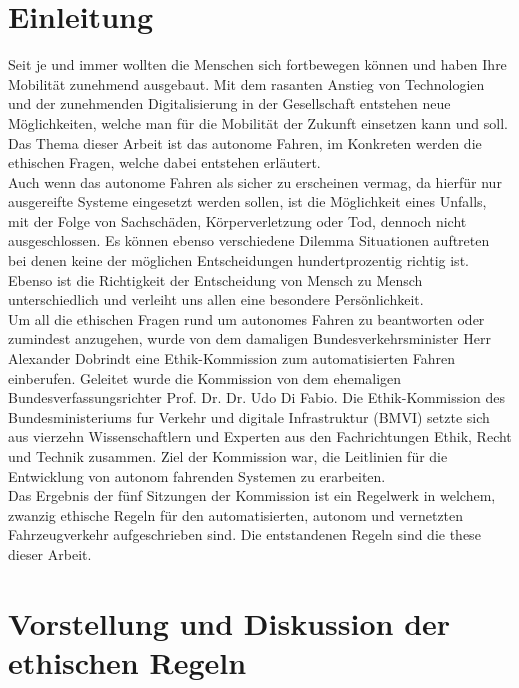 \documentclass[twoside,a4paper,12pt]{article}
\begin{document}
\section{Einleitung} \label{Einleitung}
Seit je und immer wollten die Menschen sich fortbewegen können und haben Ihre Mobilität zunehmend ausgebaut. Mit dem rasanten Anstieg von Technologien und der zunehmenden Digitalisierung in der Gesellschaft entstehen neue Möglichkeiten, welche man für die Mobilität der Zukunft einsetzen kann und soll. Das Thema dieser Arbeit ist das autonome Fahren, im Konkreten werden die ethischen Fragen, welche dabei entstehen erläutert. \\ Auch wenn das autonome Fahren als sicher zu erscheinen vermag, da hierfür nur ausgereifte Systeme eingesetzt werden sollen, ist die Möglichkeit eines Unfalls, mit der Folge von Sachschäden, Körperverletzung oder Tod, dennoch nicht ausgeschlossen. Es können ebenso verschiedene Dilemma Situationen auftreten bei denen keine der möglichen Entscheidungen hundertprozentig richtig ist. Ebenso ist die Richtigkeit der Entscheidung von Mensch zu Mensch unterschiedlich und verleiht uns allen eine besondere Persönlichkeit. \\ Um all die ethischen Fragen rund um autonomes Fahren zu beantworten oder zumindest anzugehen, wurde von dem damaligen Bundesverkehrsminister Herr Alexander Dobrindt eine Ethik-Kommission zum automatisierten Fahren einberufen. Geleitet wurde die Kommission von dem ehemaligen Bundesverfassungsrichter Prof. Dr. Dr. Udo Di Fabio. Die Ethik-Kommission des Bundesministeriums fur Verkehr und digitale Infrastruktur (BMVI) setzte sich aus vierzehn Wissenschaftlern und Experten aus den Fachrichtungen Ethik, Recht und Technik zusammen. \cite{bmvi1} Ziel der Kommission war, die Leitlinien für die Entwicklung von autonom fahrenden Systemen zu erarbeiten. \\
Das Ergebnis der fünf Sitzungen der Kommission ist ein Regelwerk in welchem, zwanzig ethische Regeln für den automatisierten, autonom
und vernetzten Fahrzeugverkehr aufgeschrieben sind. Die entstandenen Regeln sind die these dieser Arbeit. 

\newpage

\tableofcontents


\listoffigures

\newpage

\mainmatter

\cleardoublepage
\section{Vorstellung und Diskussion der ethischen Regeln} \label{VorstellungUndDiskussionDerEthischenRegeln}
\end{document}
